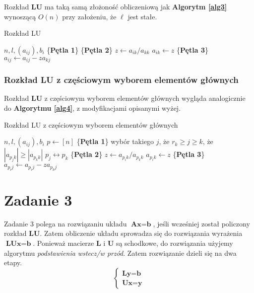 \documentclass[12pt]{article}
\begin{document}
Rozkład \textbf{LU} ma taką samą złożoność obliczeniową jak \textbf{Algorytm \ref{alg3}} wynoszącą $O(n)$ przy założeniu, że $\ell$ jest stałe.
\begin{algorithm} %
\caption{Rozkład LU}
\label{alg5} %
\begin{algorithmic} %
    \REQUIRE $n, l, (a_{ij}), b_i$
    \STATE \{\textbf{Pętla 1}\}
    		\STATE \{\textbf{Pętla 2}\}
		\STATE $z \leftarrow a_{ik}/a_{kk}$
		\STATE $a_{ik} \leftarrow z$
    			\STATE \{\textbf{Pętla 3}\}
				\STATE $a_{ij} \leftarrow a_{ij} - z a_{kj}$
    			\ENDFOR
    		\ENDFOR
    \ENDFOR
\end{algorithmic}
\end{algorithm}

\clearpage
\subsubsection*{Rozkład LU z częściowym wyborem elementów głównych}
Rozkład \textbf{LU} z częściowym wyborem elementów głównych wygląda analogicznie do \textbf{Algorytmu \ref{alg4}}, z modyfikacjami opisanymi wyżej.
\begin{algorithm} %
\caption{Rozkład LU z częściowym wyborem elementów głównych}
\label{alg6} %
\begin{algorithmic} %
    \REQUIRE $n, l, (a_{ij}), b_i$
    \STATE $p \leftarrow [n]$
    \STATE \{\textbf{Pętla 1}\}
		\STATE wybór takiego $j$, że $r_k \geq j \geq k$, że $|a_{p_jk}| \geq |a_{p_kk}|$
		\STATE $p_j \leftrightarrow p_k$
    		\STATE \{\textbf{Pętla 2}\}
		\STATE $z \leftarrow a_{p_ik}/a_{p_kk}$
		\STATE $a_{p_ik} \leftarrow z$
    			\STATE \{\textbf{Pętla 3}\}
				\STATE $a_{p_ij} \leftarrow a_{p_ij} - z a_{p_kj}$
    			\ENDFOR
    		\ENDFOR
    \ENDFOR
\end{algorithmic}
\end{algorithm}

\section{Zadanie 3}
Zadanie 3 polega na rozwiązaniu układu $\textbf{A}\textbf{x} = \textbf{b}$, jeśli wcześniej został policzony rozkład \textbf{LU}. Zatem obliczenie układu sprowadza się do rozwiązania wyrażenia $\textbf{L} \textbf{U} \textbf{x} = \textbf{b}$. Ponieważ macierze \textbf{L} i \textbf{U} są schodkowe, do rozwiązania użyjemy algorytmu \textit{podstawienia wstecz/w przód}. Zatem rozwiązanie dzieli się na dwa etapy.
\begin{equation}
\begin{cases} 
\textbf{L} \textbf{y} = \textbf{b}\\
\textbf{U} \textbf{x} = \textbf{y}
\end{cases}
\end{equation}
\end{document}
